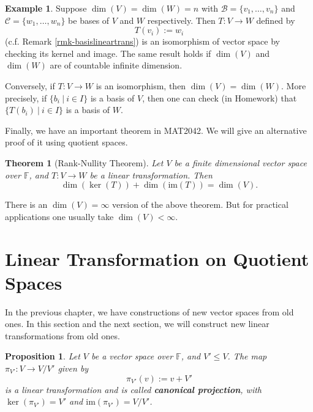 \documentclass[11pt,openany]{book}
\theoremstyle{plain}
\newtheorem{theorem}{Theorem}[chapter]
\newtheorem{proposition}[proposition]{Proposition}
\theoremstyle{definition}
\newtheorem{example}[example]{Example}
\theoremstyle{remark}
\begin{document}
\begin{example} \label{eg-kerim}
Suppose $\dim(V) = \dim(W) = n$ with $\mathcal{B} = \{v_1, \dots, v_n\}$ and $\mathcal{C} = \{w_1, \dots, w_n\}$ be bases of $V$ and $W$ respectively. Then $T:V \to W$ defined by
$$T(v_i) := w_i$$
(c.f. Remark \ref{rmk-basislineartrans}) is an isomorphism of vector space by checking its kernel and image. The same result holds if $\dim(V)$ and $\dim(W)$ are of countable infinite dimension.

Conversely, if $T: V \to W$ is an isomorphism, then $\dim(V) = \dim(W)$. More precisely, if $\{b_i\ |\ i \in I\}$ is a basis of $V$, then one can check (in Homework) that $\{T(b_i)\ |\ i \in I\}$ is a basis of $W$. 
\end{example}

Finally, we have an important theorem in MAT2042. We will give an alternative proof of it using quotient spaces.
\begin{theorem}[Rank-Nullity Theorem] \label{thm-rn}
    Let $V$ be a finite dimensional vector space over $\mathbb{F}$, and $T:V \to W$ be a linear transformation. Then
    $$\dim(\ker(T)) + \dim(\mathrm{im}(T)) = \dim(V).$$
\end{theorem}
There is an $\dim(V) = \infty$ version of the above theorem. But for practical applications one usually take $\dim(V) < \infty$.

\section{Linear Transformation on Quotient Spaces}
In the previous chapter, we have constructions of new vector spaces from old ones. In this section and the next section, we will construct new linear transformations from old ones.
\begin{proposition}
    Let $V$ be a vector space over $\mathbb{F}$, and $V' \leq V$. The map $\pi_{V'}: V \to V/V'$ given by
    $$\pi_{V'}(v) := v + V'$$
    is a linear transformation and is called {\bf canonical projection}, with $\ker(\pi_{V'}) = V'$ and $\mathrm{im}(\pi_{V'})= V/V'$.
\end{proposition}
\end{document}

